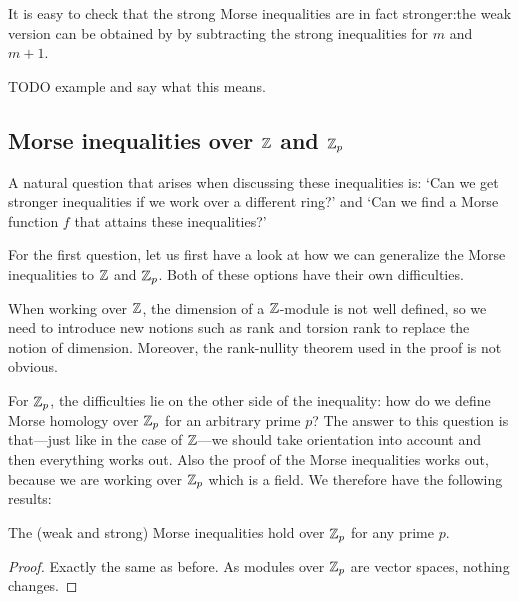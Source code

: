 It is easy to check that the strong Morse inequalities are in fact stronger:the weak version can be obtained by by subtracting the strong inequalities for $m$ and  $m+1$.



\begin{eg}
    TODO example and say what this means.
\end{eg}

\subsection{Morse inequalities over $\mathbb{Z}$ and $\mathbb{Z}_p$}

A natural question that arises when discussing these inequalities is: `Can we get stronger inequalities if we work over a different ring?' and `Can we find a Morse function $f$ that attains these inequalities?'

For the first question, let us first have a look at how we can generalize the Morse inequalities to $\mathbb{Z}$ and $\mathbb{Z}_p$.
Both of these options have their own difficulties.

When working over $\mathbb{Z}$, the dimension of a $\mathbb{Z}$-module is not well defined, so we need to introduce new notions such as rank and torsion rank to replace the notion of dimension. Moreover, the rank-nullity theorem used in the proof is not obvious.

For $\mathbb{Z}_p$, the difficulties lie on the other side of the inequality: how do we define Morse homology over $\mathbb{Z}_p$ for an arbitrary prime $p$?
The answer to this question is that---just like in the case of $\mathbb{Z}$---we should take orientation into account and then everything works out.
Also the proof of the Morse inequalities works out, because we are working over $\mathbb{Z}_p$ which is a field. We therefore have the following results:

\begin{theorem}
    The (weak and strong) Morse inequalities hold over $\mathbb{Z}_p$ for any prime $p$.
\end{theorem}
\begin{proof}
    Exactly the same as before. As modules over $\mathbb{Z}_p$ are vector spaces, nothing changes.
\end{proof}

